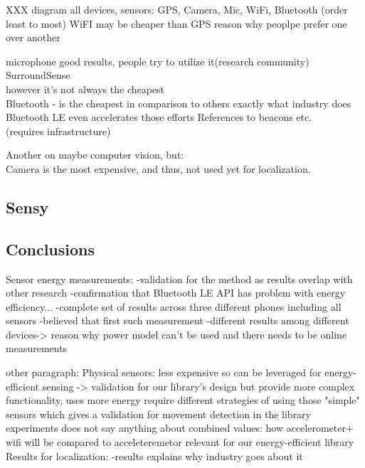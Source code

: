 XXX diagram all devices, sensors: GPS, Camera, Mic, WiFi, Bluetooth (order least to most)
WiFI may be cheaper than GPS
	reason why peoplpe prefer one over another				
				
microphone good results, people try to utilize it(research community)\\
				SurroundSense \cite{azizyan:surroundsense}\\
				however it's not always the cheapest\\
	
Bluetooth - is the cheapest in comparison to others
				exactly what industry does\\
				Bluetooth LE even accelerates those efforts
				References to beacons etc.\\
				(requires infrastructure)
				
Another on maybe computer vision, but:				\\
	Camera is the most expensive, and thus, not used yet for localization.\\
	
			
								
\subsection{Sensy}
\subsection{Conclusions}
Sensor energy measurements:
	-validation for the method
			as results overlap with other research
	-confirmation that Bluetooth LE API has problem with energy efficiency...
	-complete set of results across three different phones including all sensors
		-believed that first such measurement
	-different results among different devices-> reason why power model can't be used and there needs to be online measurements

other paragraph:
	Physical sensors:
		less expensive so can be leveraged for energy-efficient sensing
			-> validation for our library's design
		but provide more complex functionality, uses more energy
			require different strategies of using those "simple" sensors
				which gives a validation for movement detection in the library
		experiments does not say anything about combined values:
			how accelerometer+ wifi will be compared to acceleteremetor
				relevant for our energy-efficient library
	Results for localization: 
		-results explains why industry goes about it